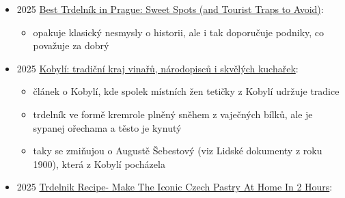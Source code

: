 \begin{itemize}
  \begin{itemize}
  \tightlist
  \item
    Saschische Zeitung
  \item
    článek v němčině,
  \item
    začíná textem o polské paní z vesnice severně od Białystoku, co už
    50 let vyrábí Sekacz, což je varianta Baumkuchenu, ale ze suššího
    těsta
  \item
    pak pokračuje text o trdelníku a trdlokafé. trdelník milujou
    turisti, Češi jsou chladnější
  \item
    Velký podíl na rozšíření této pochoutky v zemi má podnikatel Radek
    Klein. Před deseti lety začal s výrobou v Brně. Dnes firma
    Trdlokafe, jejímž spoluzakladatelem je Klein, provozuje přes 330
    poboček
  \item
    pak následuje zase legenda o Gvadánim a že při pečení vznikne
    karamelizovaná kůrka (ta vzniká u Kurtose, ne trdelníku, kterej se
    potírá tukem)
  \item
    pak popisujou byznys Trdlokafé, prodejny dosahují přes miliardu
    korun v tržbách ročně
  \item
    dvě prodejny jsou i v Drážďanech
  \end{itemize}
\item
  2025
  \href{https://www.eatingeurope.com/blog/best-trdelnik-in-prague/}{Best
  Trdelník in Prague: Sweet Spots (and Tourist Traps to Avoid)}:

  \begin{itemize}
  \tightlist
  \item
    opakuje klasický nesmysly o historii, ale i tak doporučuje podniky,
    co považuje za dobrý
  \end{itemize}
\item
  2025
  \href{https://www.lideazeme.cz/clanek/lideazeme-cz-cesko-jihovychod/131289/kobyli-tradicni-kraj-vinaru-narodopiscu-i-skvelych-kucharek.html}{Kobylí:
  tradiční kraj vinařů, národopisců i skvělých kuchařek}:

  \begin{itemize}
  \tightlist
  \item
    článek o Kobylí, kde spolek místních žen tetičky z Kobylí udržuje
    tradice
  \item
    trdelník ve formě kremrole plněný sněhem z vaječných bílků, ale je
    sypanej ořechama a těsto je kynutý
  \item
    taky se zmiňujou o Augustě Šebestový (viz Lidské dokumenty z roku
    1900), která z Kobylí pocházela
  \end{itemize}
\item
  2025
  \href{https://thefoodhog.com/czech-trdelnik-recipe-in-2-hours/}{Trdelnik
  Recipe- Make The Iconic Czech Pastry At Home In 2 Hours}:


\end{itemize}
